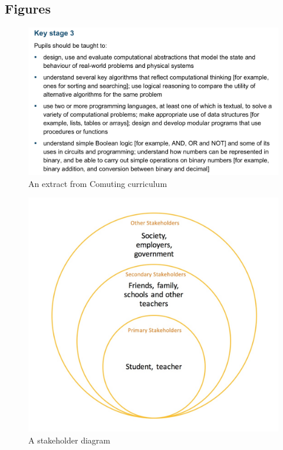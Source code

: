\documentclass[a4wide, 11pt]{article}
\begin{document}
\subsection{Figures}

\begin{figure}[h]
  \includegraphics[scale=0.25]{curriculum_extract.jpeg}
  \centering
  \caption{An extract from Comuting curriculum}
\end{figure}

\begin{figure}[h]
  \includegraphics[scale=0.25]{stakeholders.jpeg}
  \centering
  \caption{A stakeholder diagram}
\end{figure}
\end{document}
